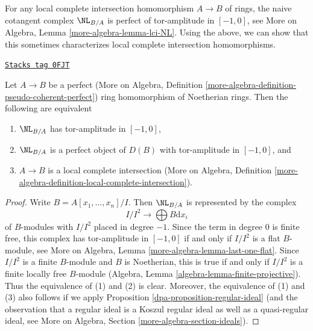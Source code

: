 For any local complete intersection homomorphism $A \to B$
of rings, the naive cotangent complex $\NL_{B/A}$ is perfect
of tor-amplitude in $[-1, 0]$, see
More on Algebra, Lemma \ref{more-algebra-lemma-lci-NL}.
Using the above, we can show that this sometimes
characterizes local complete intersection homomorphisms.

\begin{lemma}
\label{dpa-lemma-perfect-NL-lci}
\href{https://stacks.math.columbia.edu/tag/0FJT}{\texttt{Stacks tag 0FJT}}

Let $A \to B$ be a perfect (More on Algebra, Definition
\ref{more-algebra-definition-pseudo-coherent-perfect})
ring homomorphism of Noetherian rings. Then the following are equivalent
\begin{enumerate}
\item $\NL_{B/A}$ has tor-amplitude in $[-1, 0]$,
\item $\NL_{B/A}$ is a perfect object of $D(B)$
with tor-amplitude in $[-1, 0]$, and
\item $A \to B$ is a local complete intersection
(More on Algebra, Definition
\ref{more-algebra-definition-local-complete-intersection}).
\end{enumerate}
\end{lemma}

\begin{proof}

Write $B = A[x_1, \ldots, x_n]/I$. Then $\NL_{B/A}$ is represented by
the complex
$$
I/I^2 \longrightarrow \bigoplus B \text{d}x_i
$$
of $B$-modules with $I/I^2$ placed in degree $-1$. Since the term in
degree $0$ is finite free, this complex has tor-amplitude in $[-1, 0]$ if and
only if $I/I^2$ is a flat $B$-module, see
More on Algebra, Lemma \ref{more-algebra-lemma-last-one-flat}.
Since $I/I^2$ is a finite $B$-module and $B$ is Noetherian, this is true
if and only if $I/I^2$ is a finite locally free $B$-module
(Algebra, Lemma \ref{algebra-lemma-finite-projective}).
Thus the equivalence of (1) and (2) is clear. Moreover, the equivalence
of (1) and (3) also follows if we apply
Proposition \ref{dpa-proposition-regular-ideal}
(and the observation that a regular ideal is a Koszul regular
ideal as well as a quasi-regular ideal, see
More on Algebra, Section \ref{more-algebra-section-ideals}).
\end{proof}

